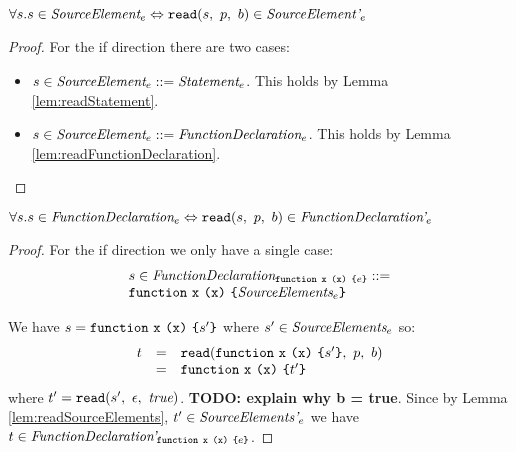 \documentclass[preprint,10pt]{sigplanconf}
\begin{document}
\begin{lemma}\mbox{}
  
  \( \forall s. s \in \textit{SourceElement}_{e} \Leftrightarrow 
  \texttt{read}(s,~p,~b) \in \textit{SourceElement'}_{e} \)
\end{lemma}
\begin{proof}
  For the if direction there are two cases:
  \begin{itemize}
  \item \( s \in \textit{SourceElement}_{e} ::= \textit{Statement}_{e} \).
    This holds by Lemma \ref{lem:readStatement}.
    
  \item \( s \in \textit{SourceElement}_{e} ::=
    \textit{FunctionDeclaration}_{e} \). This holds by Lemma
    \ref{lem:readFunctionDeclaration}.
  \end{itemize}
\end{proof}

\begin{lemma}\mbox{}
  
  \( \forall s. s \in \textit{FunctionDeclaration}_{e} \Leftrightarrow 
  \texttt{read}(s,~p,~b) \in \textit{FunctionDeclaration'}_{e} \)
\end{lemma}
\begin{proof}
  For the if direction we only have a single case: 
  \[ 
  \begin{array}{lcl}
  s \in
  \textit{FunctionDeclaration}_{\texttt{function}~\texttt{x}~\texttt{(}\texttt{x}\texttt{)}~\texttt{\{}e\texttt{\}}}
  ::= 
  \\
  \texttt{function}~\texttt{x}~\texttt{(}\texttt{x}\texttt{)}~\texttt{\{}\textit{SourceElements}_{e}\texttt{\}}
  \end{array}
  \]

 We have \( s = \texttt{function}~\texttt{x}~\texttt{(}\texttt{x}\texttt{)}~\texttt{\{}s'\texttt{\}}
 \) where \( s' \in \textit{SourceElements}_{e} \) so:
 \[
 \begin{array}{rcl}
   t &=& \texttt{read}(\texttt{function}~\texttt{x}~\texttt{(}\texttt{x}\texttt{)}~\texttt{\{}s'\texttt{\}},~p,~b)
   \\
   &=& \texttt{function}~\texttt{x}~\texttt{(}\texttt{x}\texttt{)}~\texttt{\{}t'\texttt{\}}
 \end{array}
 \]
 where \( t' = \texttt{read}(s',~\epsilon,~\textit{true}) \). \textbf{TODO:
   explain why b = true}. Since by Lemma \ref{lem:readSourceElements},
 \( t' \in \textit{SourceElements'}_{e} \) we have \( t \in \textit{FunctionDeclaration'}_{\texttt{function}~\texttt{x}~\texttt{(}\texttt{x}\texttt{)}~\texttt{\{}e\texttt{\}}} \).
\end{proof}
\end{document}
